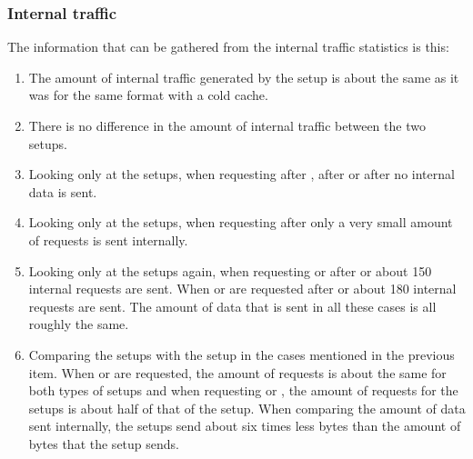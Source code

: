 \documentclass[twoside,openright]{uva-bachelor-thesis}
\begin{document}
\subsubsection{Internal traffic}
The information that can be gathered from the internal traffic statistics is
this:
\begin{enumerate}
    \item
        The amount of internal traffic generated by the \cdn setup is about the
        same as it was for the same format with a cold cache.

    \item
        There is no difference in the amount of internal traffic between the
        two \lt setups.

    \item
        Looking only at the \lt setups, when requesting \dash after \iss, \iss
        after \dash or \hds after \hls no internal data is sent.

    \item Looking only at the \lt setups, when requesting \hls after \hds only a
        very small amount of requests is sent internally.

    \item Looking only at the \lt setups again, when requesting \hds or \hls after
        \dash or \iss about 150 internal requests are sent. When \dash or \iss
        are requested after \hds or \hls about 180 internal requests are sent.
        The amount of data that is sent in all these cases is all roughly the
        same.

    \item
        Comparing the \lt setups with the \cdn setup in the cases mentioned in
        the previous item. When \hds or \hls are requested, the amount of
        requests is about the same for both types of setups and when requesting
        \dash or \iss, the amount of requests for the \lt setups is about half
        of that of the \cdn setup. When comparing the amount of data sent
        internally, the \lt setups send about six times less
        bytes than the amount of bytes that the \cdn setup sends.

\end{enumerate}






\FloatBarrier
\end{document}
